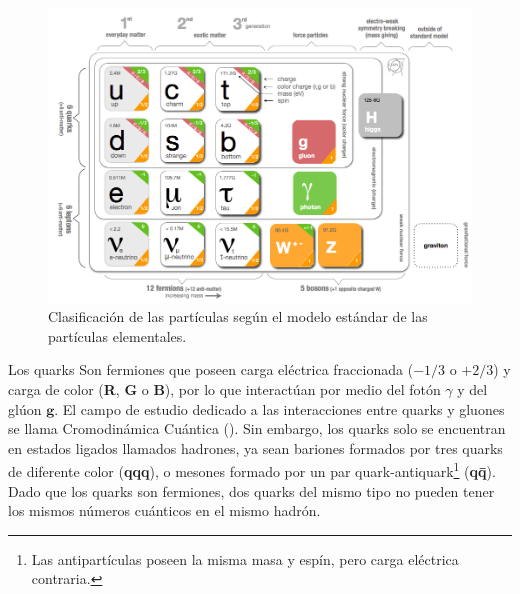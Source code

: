 \begin{figure}[!b]
    \centering
    \includegraphics[width=.8\textwidth]{Fisica_de_Particulas/imagenes/standard_model.png}
    \caption{Clasificación de las partículas según el modelo estándar de las partículas elementales.}
    \label{estandar}
\end{figure}


Los quarks Son fermiones que poseen carga eléctrica fraccionada ($- 1/3$ o $+ 2/3$) y carga de color (\textbf{R}, \textbf{G} o \textbf{B}), por lo que interactúan por medio del fotón $\gamma$ y del glúon $\mathbf{g}$. El campo de estudio dedicado a las interacciones entre quarks y gluones se llama Cromodinámica Cuántica (\QCD). Sin embargo, los quarks solo se encuentran en estados ligados llamados hadrones, ya sean bariones formados por tres quarks de diferente color (\textbf{qqq}), o mesones formado por un par quark-antiquark\footnote{Las antipartículas poseen la misma masa y espín, pero carga eléctrica contraria.} (\textbf{q\={q}}). Dado que los quarks son fermiones, dos quarks del mismo tipo no pueden tener los mismos n\'umeros cuánticos en el mismo hadrón.

